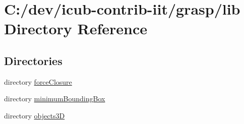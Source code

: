 \section{C\+:/dev/icub-\/contrib-\/iit/grasp/lib Directory Reference}
\label{dir_365348fb92479d37ef4342dfa78f6e2f}
\subsection*{Directories}
\begin{DoxyCompactItemize}
\item 
directory \hyperlink{dir_f0d07e9781124531f6a334c59340410c}{force\+Closure}
\item 
directory \hyperlink{dir_ed606719c7db51b3b009f197b88dba3b}{minimum\+Bounding\+Box}
\item 
directory \hyperlink{dir_b49e91218b0b14133bce8b305bc7a5c8}{objects3\+D}
\end{DoxyCompactItemize}

